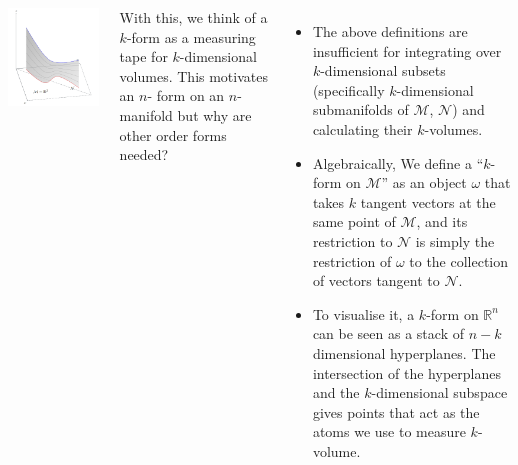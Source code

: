 \documentclass[20pt,margin=1in,innermargin=-4.5in,blockverticalspace=-0.25in]{tikzposter}
\begin{document}
\begin{columns}
{\begin{center}
                \includegraphics[scale=0.35]{otherformsmotiv.png}
            \end{center}
            With this, we think of a $k$-form as a measuring tape for $k$-dimensional volumes. This motivates an $n$- form on an $n$-manifold but why are other order forms needed? 
            \begin{itemize}
                \item The above definitions are insufficient for integrating over $k$-dimensional subsets (specifically $k$-dimensional submanifolds of $\mathcal{M}$, $\mathcal{N}$) and calculating their $k$-volumes. 
                \item Algebraically, We define a “\( k \)-form on \( \mathcal{M} \)” as an object \( \omega \) that takes \( k \) tangent vectors at the same point of \( \mathcal{M} \), and its restriction to \( \mathcal{N} \) is simply the restriction of \( \omega \) to the collection of vectors tangent to \( \mathcal{N} \).
                \item To visualise it, a $k$-form on $\mathbb{R}^n$ can be seen as a stack of $n-k$ dimensional hyperplanes. The intersection of the hyperplanes and the $k$-dimensional subspace gives points that act as the atoms we use to measure $k$-volume.

\end{itemize}}
\end{columns}
\end{document}

